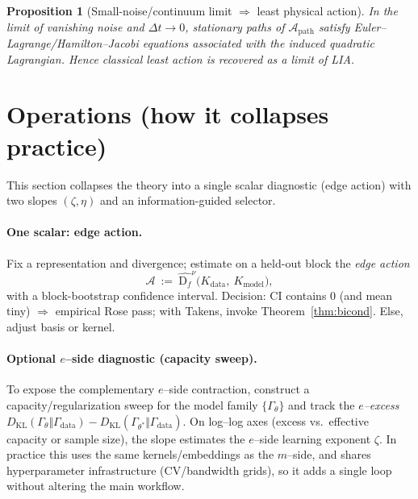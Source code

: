 \documentclass[11pt]{article}
\newtheorem{proposition}{Proposition}
\newcommand{\Df}{\mathrm{D}_f}
\newcommand{\1}{\mathbf{1}}
\begin{document}
\begin{proposition}[Small-noise/continuum limit $\Rightarrow$ least physical action]
In the limit of vanishing noise and \(\Delta t\to 0\), stationary paths of \(\mathcal A_{\mathrm{path}}\) satisfy Euler--Lagrange/Hamilton--Jacobi equations associated with the induced quadratic Lagrangian. Hence classical least action is recovered as a limit of LIA.
\end{proposition}

\section{Operations (how it collapses practice)}
This section collapses the theory into a single scalar diagnostic (edge action) with two slopes $(\zeta,\eta)$ and an information-guided selector.

\paragraph{One scalar: edge action.}
Fix a representation and divergence; estimate on a held-out block the \emph{edge action}
\[
\mathcal A\ :=\ \widehat{\Df}^{\nu}\!\big(K_{\text{data}},\ K_{\text{model}}\big),
\]
with a block-bootstrap confidence interval. Decision: CI contains \(0\) (and mean tiny) \(\Rightarrow\) empirical Rose pass; with Takens, invoke Theorem~\ref{thm:bicond}. Else, adjust basis or kernel.

\paragraph{Optional $e$--side diagnostic (capacity sweep).}
To expose the complementary $e$–side contraction, construct a capacity/regularization sweep
for the model family $\{\Gamma_\theta\}$ and track the \emph{$e$–excess}
\(
D_{\mathrm{KL}}(\Gamma_\theta\Vert \Gamma_{\text{data}}) - D_{\mathrm{KL}}(\Gamma_{\theta^\ast}\Vert \Gamma_{\text{data}})
\).
On log–log axes (excess vs.\ effective capacity or sample size), the slope estimates the $e$–side
learning exponent $\zeta$. In practice this uses the same kernels/embeddings as the $m$–side, and
shares hyperparameter infrastructure (CV/bandwidth grids), so it adds a single loop without
altering the main workflow.
\end{document}
